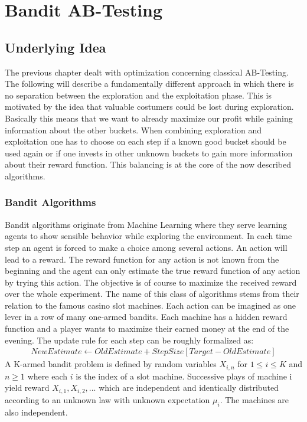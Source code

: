 \documentclass[main.tex]{subfiles}
\begin{document}
\chapter{Bandit AB-Testing}
\section{Underlying Idea}
The previous chapter dealt with optimization concerning classical AB-Testing. The following will describe a fundamentally different approach in which there is no separation between the exploration and the exploitation phase. This is motivated by the idea that valuable costumers could be lost during exploration. Basically this means that we want to already maximize our profit while gaining information about the other buckets. When combining exploration and exploitation one has to choose on each step if a known good bucket should be used again or if one invests in other unknown buckets to gain more information about their reward function. This balancing is at the core of the now described algorithms.

\subsection{Bandit Algorithms}
Bandit algorithms originate from Machine Learning where they serve learning agents to show sensible behavior while exploring the environment. In each time step an agent is forced to make a choice among several actions. An action will lead to a reward. The reward function for any action is not known from the beginning and the agent can only estimate the true reward function of any action by trying this action. The objective is of course to maximize the received reward over the whole experiment. The name of this class of algorithms stems from their relation to the famous casino slot machines. Each action can be imagined as one lever in a row of many one-armed bandits. Each machine has a hidden reward function and a player wants to maximize their earned money at the end of the evening. The update rule for each step can be roughly formalized as:
\begin{align*}
NewEstimate \leftarrow OldEstimate + StepSize[Target - OldEstimate]
\end{align*}
A K-armed bandit problem is defined by random variables $X_{i,n}$ for $1 \leq i \leq K$ and $n\geq1$ where each $i$ is the index of a slot machine. Successive plays of machine i yield reward $X_{i,1},X_{i,2},...$ which are independent and identically distributed according to an unknown law with unknown expectation $\mu_i$. The machines are also independent.
\end{document}
